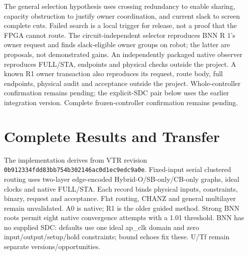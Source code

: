 \documentclass[conference,10pt]{IEEEtran}
\begin{document}
The general selection hypothesis uses crossing redundancy to enable sharing, capacity obstruction to justify owner coordination, and current slack to screen complete cuts. Failed search is a local trigger for release, not a proof that the FPGA cannot route. The circuit-independent selector reproduces BNN R 1's owner request and finds slack-eligible owner groups on robot; the latter are proposals, not demonstrated gains. An independently packaged native observer reproduces FULL/STA, endpoints and physical checks outside the project. A known R1 owner transaction also reproduces its request, route body, full endpoints, physical audit and acceptance outside the project. Whole-controller confirmation remains pending; the explicit-SDC pair below uses the earlier integration version. Complete frozen-controller confirmation remains pending.
\section{Complete Results and Transfer}
The implementation derives from VTR revision \texttt{0b912334fdd83bb754b302146ac0d1ec9edc9a0e}. Fixed-input serial clustered routing uses two-layer edge-encoded Hybrid-O/SB-only/CB-only graphs, ideal clocks and native FULL/STA. Each record binds physical inputs, constraints, binary, request and acceptance. Flat routing, CHANZ and general multilayer remain unvalidated. A0 is native; R1 is the older guided method. Strong BNN roots permit eight native convergence attempts with a 1.01 threshold. BNN has no supplied SDC: defaults use one ideal ap\_clk domain and zero input/output/setup/hold constraints; bound echoes fix these. U/Tf remain separate versions/opportunities.
\end{document}

